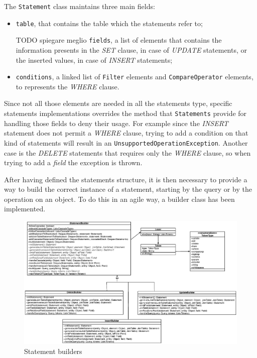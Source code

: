 \noindent The \texttt{Statement} class maintains three main fields:
\begin{itemize}
\item \texttt{table}, that contains the table which the statements refer to;
\item [TODO spiegare meglio] \texttt{fields}, a list of elements that contains the information presents in the \textit{SET} clause, in case of \textit{UPDATE} statements, or the inserted values, in case of \textit{INSERT} statements;
\item \texttt{conditions}, a linked list of \texttt{Filter} elements and \texttt{CompareOperator} elements, to represents the \textit{WHERE} clause.
\end{itemize} 

\noindent Since not all those elements are needed in all the statements type, specific statements implementations overrides the method that \texttt{Statements} provide for handling those fields to deny their usage. For example since the \textit{INSERT} statement does not permit a \textit{WHERE} clause, trying to add a condition on that kind of statements will result in an \texttt{UnsupportedOperationException}. Another case is the \textit{DELETE} statements that requires only the \textit{WHERE} clause, so when trying to add a \textit{field} the exception is thrown.

\newparagraph After having defined the statements structure, it is then necessary to provide a way to build the correct instance of a statement, starting by the query or by the operation on an object.
To do this in an agile way, a builder class has been implemented.

\begin{figure}[tbh]
  \includegraphics[width=16cm]{images/builders}
  \caption{Statement builders}
  \label{fig:builders}
\end{figure} 

